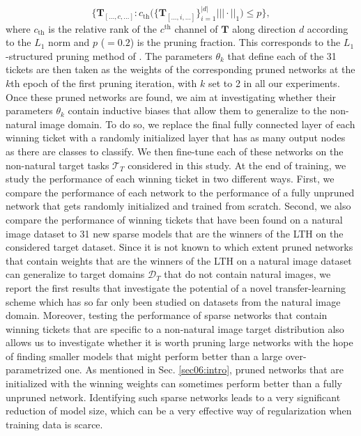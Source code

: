 \begin{equation}\label{eq:magnitude_pruning}
	\Big\{\mathbf{T}_{[..., c, ...]} : c_{\text{th}} \biggl( \{\mathbf{T}_{[..., i, ...]} \}^{|d|}_{i=1} \bigg| ||\cdot||_1 \biggr) \leq p \Big\},
\end{equation}
where $c_{\text{th}}$ is the relative rank of the $c^{\text{th}}$ channel of $\mathbf{T}$ along direction $d$ according to the $L_1$ norm and $p$ ($=0.2$) is the pruning fraction. This corresponds to the $L_1$-structured pruning method of \cite{paganini2020bespoke}.
The parameters $\theta_k$ that define each of the 31 tickets are then taken as the weights of the corresponding pruned networks at the $k$th epoch of the first pruning iteration, with $k$ set to 2 in all our experiments. Once these pruned networks are found, we aim at investigating whether their parameters $\theta_k$ contain inductive biases that allow them to generalize to the non-natural image domain. To do so, we replace the final fully connected layer of each winning ticket with a randomly initialized layer that has as many output nodes as there are classes to classify. We then fine-tune each of these networks on the non-natural target tasks $\mathcal{T}_T$ considered in this study.
At the end of training, we study the performance of each winning ticket in two different ways. First, we compare the performance of each network to the performance of a fully unpruned network that gets randomly initialized and trained from scratch. Second, we also compare the performance of winning tickets that have been found on a natural image dataset to 31 new sparse models that are the winners of the LTH on the considered target dataset. Since it is not known to which extent pruned networks that contain weights that are the winners of the LTH on a natural image dataset can generalize to target domains $\mathcal{D}_T$ that do not contain natural images, we report the first results that investigate the potential of a novel transfer-learning scheme which has so far only been studied on datasets from the natural image domain. Moreover, testing the performance of sparse networks that contain winning tickets that are specific to a non-natural image target distribution also allows us to investigate whether it is worth pruning large networks with the hope of finding smaller models that might perform better than a large over-parametrized one. As mentioned in Sec. \ref{sec06:intro}, pruned networks that are initialized with the winning weights can sometimes perform better than a fully unpruned network. Identifying such sparse networks leads to a very significant reduction of model size, which can be a very effective way of regularization when training data is scarce.


